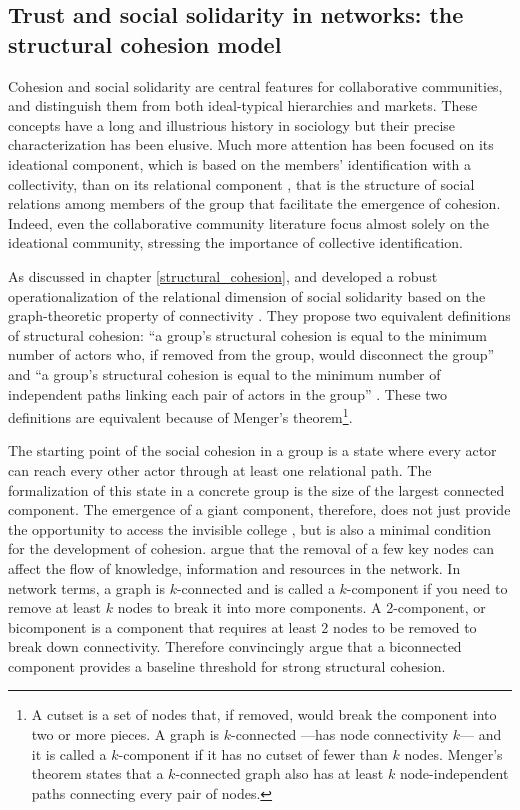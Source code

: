 \subsection{Trust and social solidarity in networks: the structural cohesion model}
\label{scm}

Cohesion and social solidarity are central features for collaborative communities, and distinguish them from both ideal-typical hierarchies and markets. These concepts have a long and illustrious history in sociology \citep{durkheim:2008} but their precise characterization has been elusive. Much more attention has been focused on its ideational component, which is based on the members' identification with a collectivity, than on its relational component \citep{doreian:1998}, that is the structure of social relations among members of the group that facilitate the emergence of cohesion. Indeed, even the collaborative community literature focus almost solely on the ideational community, stressing the importance of collective identification.

As discussed in chapter \ref{structural_cohesion}, \citet{white:2001} and \citet{moody:2003} developed a robust operationalization of the relational dimension of social solidarity based on the graph-theoretic property of connectivity \citep{harary:1969}. They propose two equivalent definitions of structural cohesion: ``a group's structural cohesion is equal to the minimum number of actors who, if removed from the group, would disconnect the group'' and ``a group's structural cohesion is equal to the minimum number of independent paths linking each pair of actors in the group'' \citep[109]{moody:2003}. These two definitions are equivalent because of Menger's theorem\footnote{A cutset is a set of nodes that, if removed, would break the component into two or more pieces. A graph is $k$-connected ---has node connectivity $k$--- and it is called a $k$-component if it has no cutset of fewer than $k$ nodes. Menger's theorem states that a $k$-connected graph also has at least $k$ node-independent paths connecting every pair of nodes.}.

The starting point of the social cohesion in a group is a state where every actor can reach every other actor through at least one relational path. The formalization of this state in a concrete group is the size of the largest connected component. The emergence of a giant component, therefore, does not just provide the opportunity to access the invisible college \citep{guimera:2005}, but is also a minimal condition for the development of cohesion. \citet{moody:2003} argue that the removal of a few key nodes can affect the flow of knowledge, information and resources in the network. In network terms, a graph is $k$-connected and is called a $k$-component if you need to remove at least $k$ nodes to break it into more components. A 2-component, or bicomponent is a component that requires at least 2 nodes to be removed to break down connectivity.  Therefore \citet{moody:2003} convincingly argue that a biconnected component provides a baseline threshold for strong structural cohesion.

